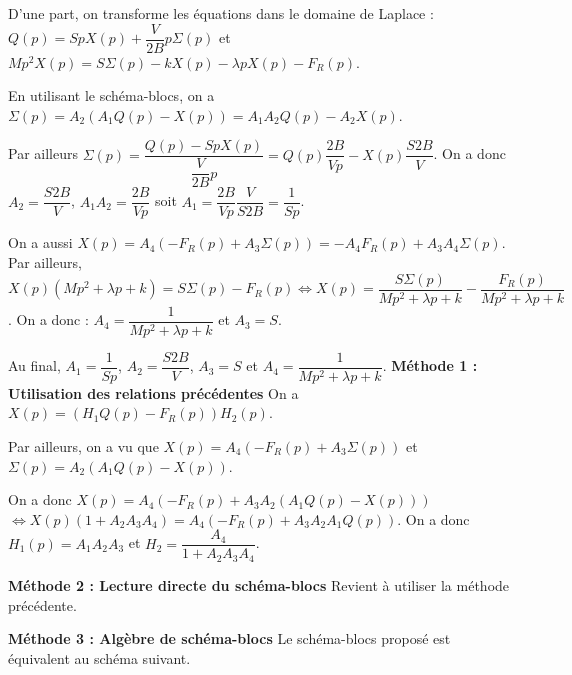 \begin{corrigebox}
D'une part, on transforme les équations dans le domaine de Laplace : 
$Q(p)=S p X(p)+\dfrac{V}{2B} p \Sigma(p)$ et
$Mp^2 X(p) = S \Sigma(p) - kX(p)-\lambda p X(p) - F_R(p)$.

En utilisant le schéma-blocs, on a $\Sigma(p)=A_2\left(A_1Q(p)-X(p)\right) = A_1A_2Q(p)-A_2X(p)$.

Par ailleurs $\Sigma(p)=\dfrac{Q(p)-S p X(p)}{\dfrac{V}{2B} p}= Q(p)\dfrac{2B}{Vp}-  X(p)  \dfrac{S2B}{V} $. On a donc $A_2 = \dfrac{S2B}{V} $, $A_1 A_2 = \dfrac{2B}{Vp}$ soit $A_1  = \dfrac{2B}{Vp}\dfrac{V}{S2B}= \dfrac{1}{Sp}$. 

On a aussi $X(p)=A_4\left(-F_R(p)+A_3\Sigma(p)\right) =-A_4F_R(p)+A_3A_4\Sigma(p)$. Par ailleurs,
$X(p) \left(Mp^2  +\lambda p  + k\right)= S \Sigma(p) - F_R(p) \Leftrightarrow X(p) =  \dfrac{S \Sigma(p)}{Mp^2  +\lambda p  + k}-\dfrac{F_R(p)}{Mp^2  +\lambda p  + k}$. On a donc : $A_4 = \dfrac{1}{Mp^2  +\lambda p  + k}$ et $A_3 = S$.

Au final,  $A_1=\dfrac{1}{Sp}$,  $A_2 = \dfrac{S2B}{V} $,  $A_3 = S$  et $A_4 = \dfrac{1}{Mp^2  +\lambda p  + k}$.
\textbf{Méthode 1 : Utilisation des relations précédentes}
On a $X(p)=\left(H_1Q(p)-F_R(p)\right)H_2(p)$. 

Par ailleurs, on a vu que $X(p)=A_4\left(-F_R(p)+A_3\Sigma(p)\right) $ et $\Sigma(p)=A_2\left(A_1Q(p)-X(p)\right)$. 

On a donc $X(p)=A_4\left(-F_R(p)+A_3  A_2\left(A_1Q(p)-X(p)\right)\right) $ $ \Leftrightarrow X(p)\left(1+A_2A_3A_4 \right)=A_4\left(-F_R(p)+A_3  A_2A_1Q(p)\right) $. On a donc 
$H_1(p)=A_1  A_2A_3$ et $H_2 = \dfrac{A_4}{1+ A_2A_3A_4 }$.

\textbf{Méthode 2 : Lecture directe du schéma-blocs}
Revient à utiliser la méthode précédente. 

\textbf{Méthode 3 : Algèbre de schéma-blocs}
Le schéma-blocs proposé est équivalent au schéma suivant. 

\footnotesize
\par\medskip\begin{center}\captionsetup{type=figure}
\end{center}
\end{corrigebox}
